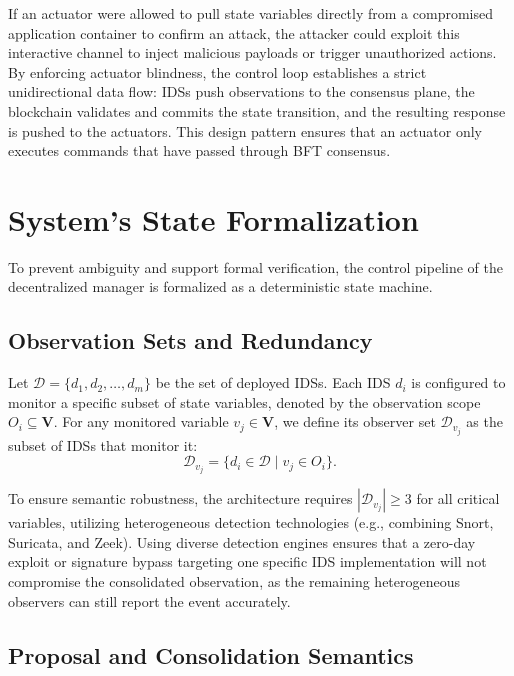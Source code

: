 If an actuator were allowed to pull state variables directly from a compromised application container to confirm an attack, the attacker could exploit this interactive channel to inject malicious payloads or trigger unauthorized actions. By enforcing actuator blindness, the control loop establishes a strict unidirectional data flow: IDSs push observations to the consensus plane, the blockchain validates and commits the state transition, and the resulting response is pushed to the actuators. This design pattern ensures that an actuator only executes commands that have passed through BFT consensus.

\section{System's State Formalization}
\label{sec:formal_state_model}

To prevent ambiguity and support formal verification, the control pipeline of the decentralized manager is formalized as a deterministic state machine.

\subsection{Observation Sets and Redundancy}
\label{subsec:observation_sets}

Let $\mathcal{D} = \{d_1, d_2, \dots, d_m\}$ be the set of deployed IDSs. Each IDS $d_i$ is configured to monitor a specific subset of state variables, denoted by the observation scope $O_i \subseteq \mathbf{V}$. For any monitored variable $v_j \in \mathbf{V}$, we define its observer set $\mathcal{D}_{v_j}$ as the subset of IDSs that monitor it:
\[
\mathcal{D}_{v_j} = \{d_i \in \mathcal{D} \mid v_j \in O_i\}.
\]

To ensure semantic robustness, the architecture requires $|\mathcal{D}_{v_j}| \ge 3$ for all critical variables, utilizing heterogeneous detection technologies (e.g., combining Snort, Suricata, and Zeek). Using diverse detection engines ensures that a zero-day exploit or signature bypass targeting one specific IDS implementation will not compromise the consolidated observation, as the remaining heterogeneous observers can still report the event accurately.

\subsection{Proposal and Consolidation Semantics}
\label{subsec:proposal_semantics}

